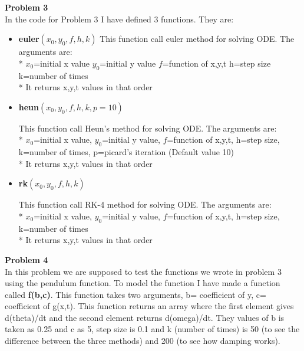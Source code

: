 \documentclass{article}
\begin{document}
\textbf{Problem 3}\vspace{1.5em}
\\
In the code for Problem 3 I have defined 3 functions. They are:
\begin{itemize}
\item{\textbf{euler$(x_0,y_0,f,h,k)$}}
This function call euler method for solving ODE. The arguments are:
\\*
       $ x_0$=initial x value
        $y_0$=initial y value
        $f$=function of x,y,t
        h=step size
        k=number of times
       \\*
        It returns x,y,t values in that order


\item{\textbf{heun$(x_0,y_0,f,h,k,p=10)$}}\vspace{0.2em}

This function call Heun's method for solving ODE. The arguments are:
\\*
        $x_0$=initial x value, 
        $y_0$=initial y value, 
        $f$=function of x,y,t, 
        h=step size, 
        k=number of times, 
        p=picard's iteration (Default value 10)
        \\*
        It returns x,y,t values in that order


\item{\textbf{rk$(x_0,y_0,f,h,k)$}}\vspace{0.2em}

This function call RK-4 method for solving ODE. The arguments are:
\\*
      $ x_0$=initial x value, 
        $y_0$=initial y value, 
        $f$=function of x,y,t, 
        h=step size, 
        k=number of times
        \\*
        It returns x,y,t values in that order


\vspace{0.2em}

\end{itemize}

\vspace{1.5em}
\textbf{Problem 4}\vspace{1.5em}
\\
In this problem we are supposed to test the functions we wrote in problem 3 using the pendulum function. To model the function I have made a function called \textbf{f(b,c)}. This function takes two arguments, b= coefficient of y, c= coefficient of g(x,t). This function returns an array where the first element gives d(theta)/dt and the second element returns d(omega)/dt. They values of b is taken as 0.25 and c as 5, step size is 0.1 and k (number of times) is 50 (to see the difference between the three methods) and 200 (to see how damping works).
\\
\end{document}
